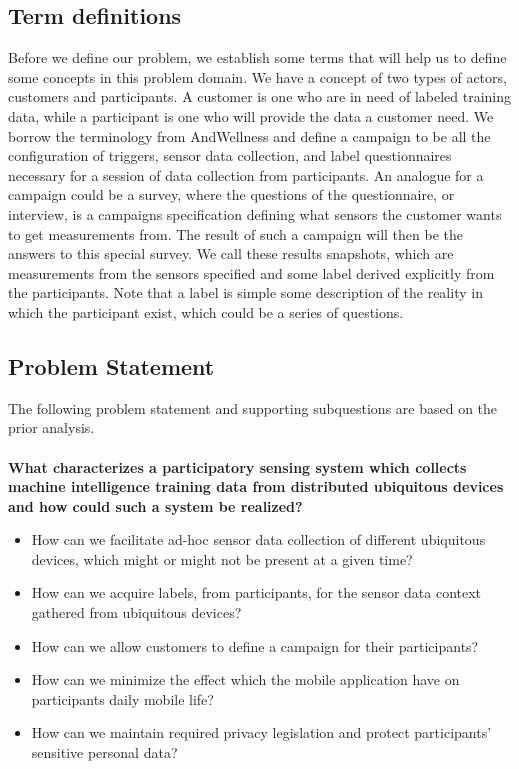\subsection{Term definitions}
Before we define our problem, we establish some terms that will help us to define some concepts in this problem domain. We have a concept of two types of actors, customers and participants. A customer is one who are in need of labeled training data, while a participant is one who will provide the data a customer need. We borrow the terminology from AndWellness \parencite{hicks2010andwellness} and define a campaign to be all the configuration of triggers, sensor data collection, and label questionnaires necessary for a session of data collection from participants. An analogue for a campaign could be a survey, where the questions of the questionnaire, or interview, is a campaigns specification defining what sensors the customer wants to get measurements from. The result of such a campaign will then be the answers to this special survey. We call these results snapshots, which are measurements from the sensors specified and some label derived explicitly from the participants. Note that a label is simple some description of the reality in which the participant exist, which could be a series of questions.

\subsection{Problem Statement}
\label{sub:problem_statement}
The following problem statement and supporting subquestions are based on the prior analysis.
\\\\
\textbf{What characterizes a participatory sensing system which collects machine intelligence training data from distributed ubiquitous devices and how could such a system be realized?}

\begin{itemize}
    \item How can we facilitate ad-hoc sensor data collection of different ubiquitous devices, which might or might not be present at a given time?

    \item How can we acquire labels, from participants, for the sensor data context gathered from ubiquitous devices?  
    
    \item How can we allow customers to define a campaign for their participants?
    
    \item How can we minimize the effect which the mobile application have on participants daily mobile life?

    \item How can we maintain required privacy legislation and protect participants' sensitive personal data? 
\end{itemize}

